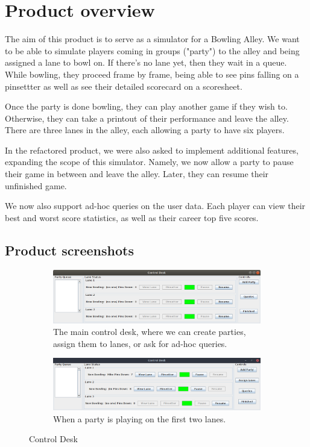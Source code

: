 \section{Product overview}

The aim of this product is to serve as a simulator for a Bowling Alley. We want to be able to simulate players coming in groups ("party") to the alley and being assigned a lane to bowl on. If there's no lane yet, then they wait in a queue. While bowling, they proceed frame by frame, being able to see pins falling on a pinsettter as well as see their detailed scorecard on a scoresheet.

Once the party is done bowling, they can play another game if they wish to. Otherwise, they can take a printout of their performance and leave the alley. There are three lanes in the alley, each allowing a party to have six players.

In the refactored product, we were also asked to implement additional features, expanding the scope of this simulator. Namely, we now allow a party to pause their game in between and leave the alley. Later, they can resume their unfinished game.

We now also support ad-hoc queries on the user data. Each player can view their best and worst score statistics, as well as their career top five scores.

\subsection{Product screenshots}

\begin{figure}[H]
    \centering
    \begin{subfigure}{\textwidth}
        \includegraphics[width = \textwidth]{img/controldesk.png}
        \caption{The main control desk, where we can create parties, assign them to lanes, or ask for ad-hoc queries.}
    \end{subfigure}
    \begin{subfigure}{\textwidth}
        \includegraphics[width = \textwidth]{img/laneRunning.png}
        \caption{When a party is playing on the first two lanes.}
    \end{subfigure}
    \caption{Control Desk}
\end{figure}

